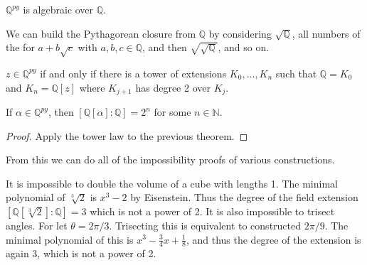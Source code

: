     \begin{theorem}
        $\mathbb{Q}^{py}$ is algebraic over $\mathbb{Q}$.
    \end{theorem}
    We can build the Pythagorean closure from $\mathbb{Q}$ by considering
    $\sqrt{\mathbb{Q}}$, all numbers of the for $a+b\sqrt{c}$ with
    $a,b,c\in\mathbb{Q}$, and then $\sqrt{\sqrt{\mathbb{Q}}}$, and so on.
    \begin{theorem}
        $z\in\mathbb{Q}^{py}$ if and only if there is a tower of extensions
        $K_{0},\dots,K_{n}$ such that $\mathbb{Q}=K_{0}$ and
        $K_{n}=\mathbb{Q}[z]$ where $K_{j+1}$ has degree 2 over $K_{j}$.
    \end{theorem}
    \begin{theorem}
        If $\alpha\in\mathbb{Q}^{py}$, then
        $[\mathbb{Q}[\alpha]:\mathbb{Q}]=2^{n}$ for some $n\in\mathbb{N}$.
    \end{theorem}
    \begin{proof}
        Apply the tower law to the previous theorem.
    \end{proof}
    From this we can do all of the impossibility proofs of various
    constructions.
    \begin{example}
        It is impossible to double the volume of a cube with lengths 1. The
        minimal polynomial of $\sqrt[3]{2}$ is $x^{3}-2$ by Eisenstein. Thus
        the degree of the field extension
        $[\mathbb{Q}[\sqrt[3]{2}]:\mathbb{Q}]=3$ which is not a power of 2.
        It is also impossible to trisect angles. For let $\theta=2\pi/3$.
        Trisecting this is equivalent to constructed $2\pi/9$. The minimal
        polynomial of this is $x^{3}-\frac{3}{4}x+\frac{1}{8}$, and thus
        the degree of the extension is again 3, which is not a power of 2.
    \end{example}
